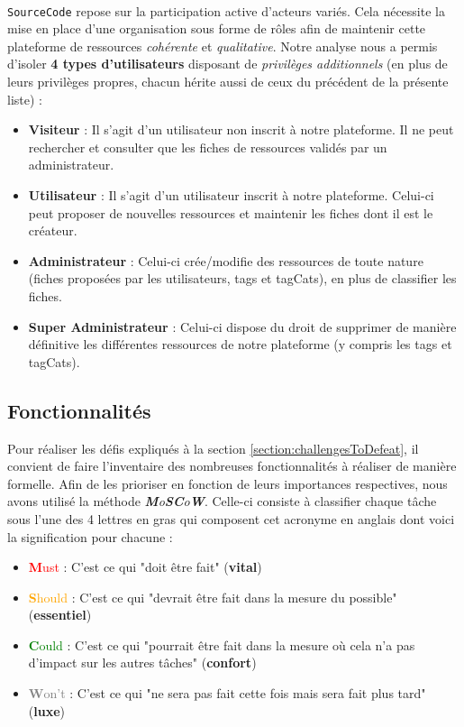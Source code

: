 \paragraph{} \texttt{SourceCode} repose sur la participation active d'acteurs variés. Cela nécessite la mise en place d'une organisation sous forme de rôles afin de maintenir cette plateforme de ressources \textit{cohérente} et \textit{qualitative}. Notre analyse nous a permis d'isoler \textbf{4 types d'utilisateurs} disposant de \textit{privilèges additionnels} (en plus de leurs privilèges propres, chacun hérite aussi de ceux du précédent de la présente liste) :

\begin{itemize}
    \item \textbf{Visiteur} : Il s'agit d'un utilisateur non inscrit à notre plateforme. Il ne peut rechercher et consulter que les \glspl{fiche} de ressources validés par un administrateur.
    \item \textbf{Utilisateur} : Il s'agit d'un utilisateur  inscrit à notre plateforme. Celui-ci peut proposer de nouvelles ressources et maintenir les \glspl{fiche} dont il est le créateur.
    \item \textbf{Administrateur} : Celui-ci crée/modifie des ressources de toute nature (\glspl{fiche} proposées par les utilisateurs, \glspl{tag} et \glspl{tagCat}), en plus de classifier les \glspl{fiche}.
    \item \textbf{Super Administrateur} : Celui-ci dispose du droit de supprimer de manière définitive les différentes ressources de notre plateforme (y compris les \glspl{tag} et \glspl{tagCat}).
\end{itemize}

\subsection*{Fonctionnalités}

Pour réaliser les défis expliqués à la section \ref{section:challengesToDefeat}, il convient de faire l'inventaire des nombreuses fonctionnalités à réaliser de manière formelle.
Afin de les prioriser en fonction de leurs importances respectives, nous avons utilisé la méthode \textit{\textbf{M}o\textbf{S}\textbf{C}o\textbf{W}}\cite{MoSCoW}. Celle-ci consiste à classifier chaque tâche sous l'une des 4 lettres en gras qui composent cet acronyme en anglais dont voici la signification pour chacune :
\begin{itemize}
    \item \textcolor{red}{\textbf{M}ust} : C'est ce qui "doit être fait" (\textbf{vital})
    \item \textcolor{orange}{\textbf{S}hould} : C'est ce qui "devrait être fait dans la mesure du possible" (\textbf{essentiel})
    \item \textcolor{green}{\textbf{C}ould} : C'est ce qui "pourrait être fait dans la mesure où cela n'a pas d'impact sur les autres tâches" (\textbf{confort})
    \item \textcolor{gray}{\textbf{W}on't} : C'est ce qui "ne sera pas fait cette fois mais sera fait plus tard" (\textbf{luxe})
\end{itemize}

